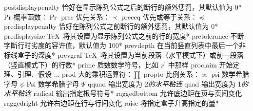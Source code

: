 \capcs postdisplaypenalty {恰好在显示陈列公式之后的断行的额外惩罚，其默认值为 0}*{}
\capcs Pr {概率函数：$\Pr$}{}{}
\capcs prec {优先关系：$\prec$}{}{}
\capcs preceq {优先或等于关系：$\preceq$}{}{}
\capcs predisplaypenalty {恰好在陈列公式之前断行的额外惩罚，其默认值为 0}*{}
\capcs predisplaysize {\TeX\ 将其设置为显示陈列公式之前的行的宽度}*{}
\capcs pretolerance {不断字断行时劣度的容许值，默认值为 100}*{}
\capcs prevdepth {在当前竖直列表中最后一个非标线盒子的深度}*{}
\capcs prevgraf {\TeX\ 将其设置为当前段落（水平模式下）或前一段落（竖直模式下）的行数}*{}
\capcs prime {质数数学符号，比如 $r^\prime$ 中那样}{}{}
\capcs proclaim {开始定理、引理、假设 $\ldots$}{}{\@proclaim}
\capcs prod {大的乘积运算符：$\prod$}{}{}
\capcs propto {比例关系：$\propto$}{}{}
\capcs psi {数学希腊字母 $\psi$}{}{}
\capcs Psi {数学希腊字母 $\Psi$}{}{}
\capcs qquad {输出宽度为 2\em 的水平粘连}{}{}
\capcs quad {输出宽度为 1\em 的水平粘连}{}{}
\capcs radical {输出指定根号符号}*{}
\capcs raggedbottom {允许底边距在页与页间变化}{}{}
\capcs raggedright {允许右边距在行与行间变化}{}{}
\capcs raise {将指定盒子升高指定的量}*{}
